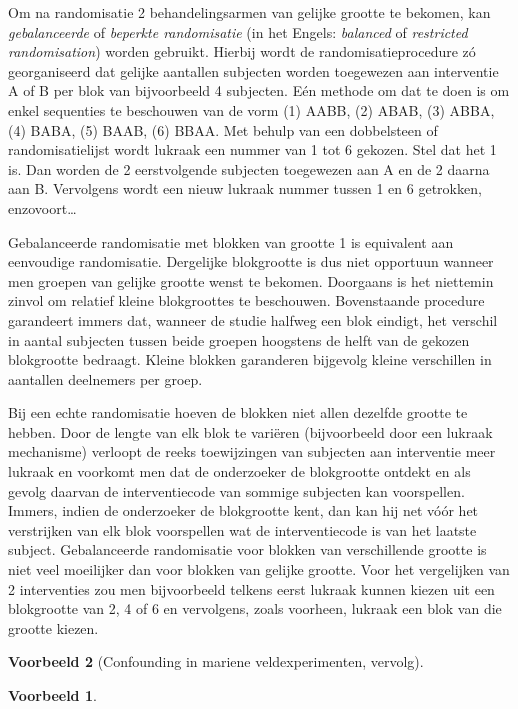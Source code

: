 \documentclass[
  12pt,dutch,coursenotes]{book}
\theoremstyle{definition}
\theoremstyle{definition}
\newtheorem{example}{Voorbeeld}[chapter]
\theoremstyle{definition}
\theoremstyle{remark}
\begin{document}
Om na randomisatie 2 behandelingsarmen van gelijke grootte te bekomen, kan
\emph{gebalanceerde} of \emph{beperkte randomisatie} (in het Engels:
\emph{balanced} of \emph{restricted randomisation}) worden gebruikt.
Hierbij wordt de randomisatieprocedure zó georganiseerd dat gelijke
aantallen subjecten worden toegewezen aan interventie A of B per blok van
bijvoorbeeld 4 subjecten. Eén methode om dat te doen is om enkel
sequenties te beschouwen van de vorm (1) AABB, (2) ABAB, (3) ABBA, (4) BABA,
(5) BAAB, (6) BBAA. Met behulp van een dobbelsteen of randomisatielijst
wordt lukraak een nummer van 1 tot 6 gekozen. Stel dat het 1 is. Dan worden
de 2 eerstvolgende subjecten toegewezen aan A en de 2 daarna aan B.
Vervolgens wordt een nieuw lukraak nummer tussen 1 en 6 getrokken,
enzovoort\ldots{}

Gebalanceerde randomisatie met blokken van grootte 1 is equivalent aan
eenvoudige randomisatie. Dergelijke blokgrootte is dus niet opportuun
wanneer men groepen van gelijke grootte wenst te bekomen.
Doorgaans is het niettemin zinvol om relatief kleine blokgroottes te
beschouwen. Bovenstaande procedure garandeert immers dat, wanneer de studie
halfweg een blok eindigt, het verschil in aantal subjecten tussen beide
groepen hoogstens de helft van de gekozen blokgrootte bedraagt.
Kleine blokken garanderen bijgevolg kleine verschillen in aantallen deelnemers per groep.

Bij een echte randomisatie hoeven de blokken niet allen dezelfde grootte te
hebben. Door de lengte van elk blok te variëren (bijvoorbeeld door een
lukraak mechanisme) verloopt de reeks toewijzingen van subjecten aan
interventie meer lukraak en voorkomt men dat de onderzoeker de blokgrootte ontdekt
en als gevolg daarvan de interventiecode van sommige subjecten kan
voorspellen. Immers, indien de onderzoeker de blokgrootte kent, dan kan hij net vóór het verstrijken van elk blok voorspellen wat de interventiecode
is van het laatste subject. Gebalanceerde randomisatie voor blokken
van verschillende grootte is niet veel moeilijker dan voor blokken van
gelijke grootte. Voor het vergelijken van 2 interventies zou men
bijvoorbeeld telkens eerst lukraak kunnen kiezen uit een blokgrootte van 2,
4 of 6 en vervolgens, zoals voorheen, lukraak een blok van die grootte
kiezen.

\begin{example}[Confounding in mariene veldexperimenten, vervolg]
\begin{example}

\protect\hypertarget{exm:unnamed-chunk-71}{}{\label{exm:unnamed-chunk-71} \iffalse (Confounding in mariene veldexperimenten, vervolg) \fi{} }

\end{example}
\end{example}
\end{document}
